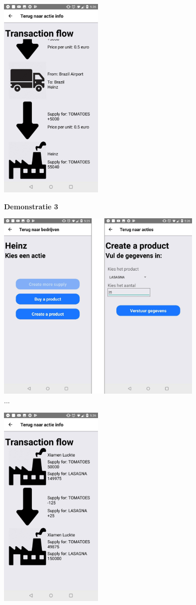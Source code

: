 \begin{center}
	\includegraphics[width=5cm]{img/react-demo-2-4}\\[1cm]
\end{center}

\textbf{Demonstratie 3}

\begin{center}
	\includegraphics[width=10cm]{img/react-demo-3-1}\\[1cm]
	...
\end{center}
\begin{center}
	\includegraphics[width=5cm]{img/react-demo-3-2}\\[1cm]
\end{center}

